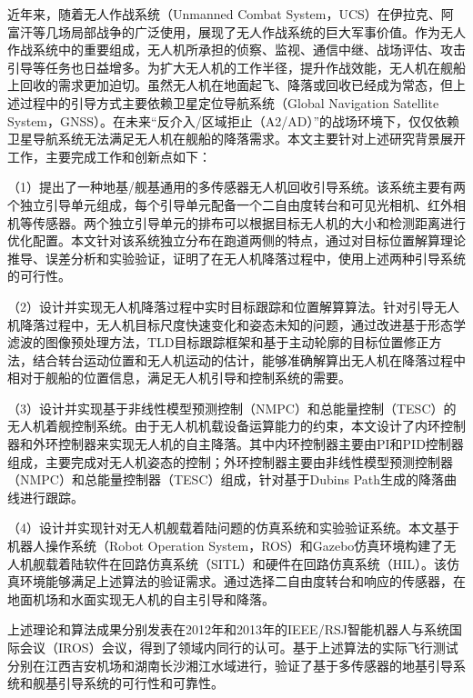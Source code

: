 \begin{cabstract}
近年来，随着无人作战系统（Unmanned Combat System，UCS）在伊拉克、阿富汗等几场局部战争的广泛使用，展现了无人作战系统的巨大军事价值。作为无人作战系统中的重要组成，无人机所承担的侦察、监视、通信中继、战场评估、攻击引导等任务也日益增多。为扩大无人机的工作半径，提升作战效能，无人机在舰船上回收的需求更加迫切。虽然无人机在地面起飞、降落或回收已经成为常态，但上述过程中的引导方式主要依赖卫星定位导航系统（Global Navigation Satellite System，GNSS）。在未来“反介入/区域拒止（A2/AD）”的战场环境下，仅仅依赖卫星导航系统无法满足无人机在舰船的降落需求。本文主要针对上述研究背景展开工作，主要完成工作和创新点如下：

（1）提出了一种地基/舰基通用的多传感器无人机回收引导系统。该系统主要有两个独立引导单元组成，每个引导单元配备一个二自由度转台和可见光相机、红外相机等传感器。两个独立引导单元的排布可以根据目标无人机的大小和检测距离进行优化配置。本文针对该系统独立分布在跑道两侧的特点，通过对目标位置解算理论推导、误差分析和实验验证，证明了在无人机降落过程中，使用上述两种引导系统的可行性。

（2）设计并实现无人机降落过程中实时目标跟踪和位置解算算法。针对引导无人机降落过程中，无人机目标尺度快速变化和姿态未知的问题，通过改进基于形态学滤波的图像预处理方法，TLD目标跟踪框架和基于主动轮廓的目标位置修正方法，结合转台运动位置和无人机运动的估计，能够准确解算出无人机在降落过程中相对于舰船的位置信息，满足无人机引导和控制系统的需要。

（3）设计并实现基于非线性模型预测控制（NMPC）和总能量控制（TESC）的无人机着舰控制系统。由于无人机机载设备运算能力的约束，本文设计了内环控制器和外环控制器来实现无人机的自主降落。其中内环控制器主要由PI和PID控制器组成，主要完成对无人机姿态的控制；外环控制器主要由非线性模型预测控制器（NMPC）和总能量控制器（TESC）组成，针对基于Dubins Path生成的降落曲线进行跟踪。

（4）设计并实现针对无人机舰载着陆问题的仿真系统和实验验证系统。本文基于机器人操作系统（Robot Operation System，ROS）和Gazebo仿真环境构建了无人机舰载着陆软件在回路仿真系统（SITL）和硬件在回路仿真系统（HIL）。该仿真环境能够满足上述算法的验证需求。通过选择二自由度转台和响应的传感器，在地面机场和水面实现无人机的自主引导和降落。

上述理论和算法成果分别发表在2012年和2013年的IEEE/RSJ智能机器人与系统国际会议（IROS）会议，得到了领域内同行的认可。基于上述算法的实际飞行测试分别在江西吉安机场和湖南长沙湘江水域进行，验证了基于多传感器的地基引导系统和舰基引导系统的可行性和可靠性。

\end{cabstract}

